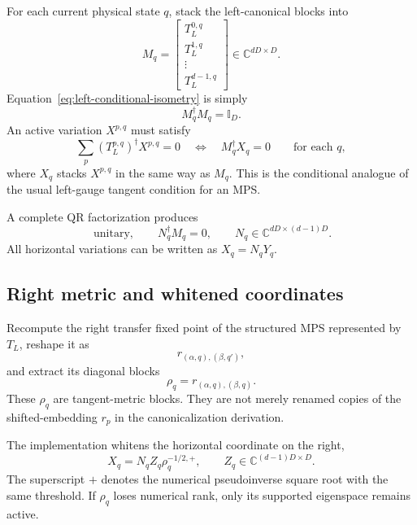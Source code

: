 \documentclass[11pt]{article}
\newcommand{\Id}{\mathbb{I}}
\newcommand{\CC}{\mathbb{C}}
\newcommand{\code}[1]{\texttt{\detokenize{#1}}}
\begin{document}
For each current physical state $q$, stack the left-canonical blocks into
\begin{equation}
  M_q=
  \begin{bmatrix}
    T_L^{0,q}\\T_L^{1,q}\\\vdots\\T_L^{d-1,q}
  \end{bmatrix}
  \in\CC^{dD\times D}.
  \label{eq:Mq}
\end{equation}
Equation~\eqref{eq:left-conditional-isometry} is simply
\begin{equation}
  M_q^\dagger M_q=\Id_D.
  \label{eq:Mq-isometry}
\end{equation}
An active variation $X^{p,q}$ must satisfy
\begin{equation}
  \sum_p(T_L^{p,q})^\dagger X^{p,q}=0
  \quad\Longleftrightarrow\quad
  M_q^\dagger X_q=0
  \qquad\text{for each }q,
  \label{eq:horizontal-condition}
\end{equation}
where $X_q$ stacks $X^{p,q}$ in the same way as $M_q$.  This is the conditional
analogue of the usual left-gauge tangent condition for an MPS.

A complete QR factorization produces
\begin{equation}
  [M_q\;N_q]\ \text{unitary},
  \qquad
  N_q^\dagger M_q=0,
  \qquad
  N_q\in\CC^{dD\times(d-1)D}.
  \label{eq:Nq}
\end{equation}
All horizontal variations can be written as $X_q=N_qY_q$.

\subsection{Right metric and whitened coordinates}

Recompute the right transfer fixed point of the structured MPS represented by
$T_L$, reshape it as
\begin{equation}
  r_{(\alpha,q),(\beta,q')},
  \label{eq:TL-right-fixed}
\end{equation}
and extract its diagonal blocks
\begin{equation}
  \rho_q=r_{(\alpha,q),(\beta,q)}.
  \label{eq:rhoq}
\end{equation}
These $\rho_q$ are tangent-metric blocks.  They are not merely renamed copies
of the shifted-embedding $r_p$ in the canonicalization derivation.

The implementation whitens the horizontal coordinate on the right,
\begin{equation}
  X_q=N_qZ_q\rho_q^{-1/2,+},
  \qquad
  Z_q\in\CC^{(d-1)D\times D}.
  \label{eq:whitened-tangent}
\end{equation}
The superscript $+$ denotes the numerical pseudoinverse square root with the
same \code{canonical_}\allowbreak\code{rcond} threshold.  If $\rho_q$ loses
numerical rank, only its supported eigenspace remains active.
\end{document}
